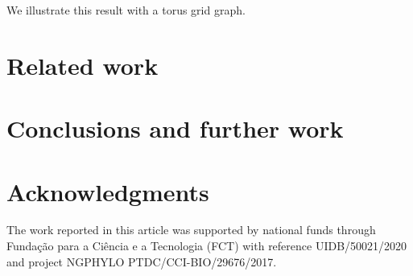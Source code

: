 \documentclass[a4paper]{article}
\begin{document}
We illustrate this result with a torus grid graph. 

\section{Related work}
\label{sec:related-work}

\section{Conclusions and further work}
\label{sec:concl-furth-work}

\section{Acknowledgments}
\label{sec:acknowledgements}
%
The work reported in this article was supported by national funds through
Funda\c{c}\~{a}o para a Ci\^{e}ncia e a Tecnologia (FCT) with reference
UIDB/50021/2020 and project NGPHYLO PTDC/CCI-BIO/29676/2017.
%

\end{document}
